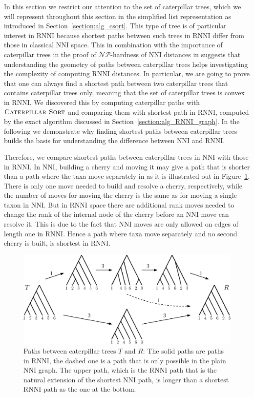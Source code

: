 \documentclass{amsart}
\newcommand{\np}{\mathcal{NP}}
\newcommand{\nni}{\mathrm{NNI}}
\newcommand{\rnni}{\mathrm{RNNI}}
\newcommand{\csort}{\textsc{Caterpillar Sort}}
\begin{document}
In this section we restrict our attention to the set of caterpillar trees, which we will represent throughout this section in the simplified list representation as introduced in Section~\ref{section:alg_csort}.
This type of tree is of particular interest in $\rnni$ because shortest paths between such trees in $\rnni$ differ from those in classical $\nni$ space.
This in combination with the importance of caterpillar trees in the proof of $\np$-hardness of $\nni$ distances in \autocite{Dasgupta2000-xa} suggests that understanding the geometry of paths between caterpillar trees helps investigating the complexity of computing $\rnni$ distances.
In particular, we are going to prove that one can always find a shortest path between two caterpillar trees that contains caterpillar trees only, meaning that the set of caterpillar trees is convex in $\rnni$.
We discovered this by computing caterpillar paths with $\csort$ and comparing them with shortest path in $\rnni$, computed by the exact algorithm discussed in Section~\ref{section:alg_RNNI_graph}.
In the following we demonstrate why finding shortest paths between caterpillar trees builds the basis for understanding the difference between $\nni$ and $\rnni$.

Therefore, we compare shortest paths between caterpillar trees in $\nni$ with those in $\rnni$.
In $\nni$, building a cherry and moving it may give a path that is shorter than a path where the taxa move separately in as it is illustrated out in Figure~\ref{fig:NNI_vs_RNNI}.
There is only one move needed to build and resolve a cherry, respectively, while the number of moves for moving the cherry is the same as for moving a single taxon in $\nni$.
But in $\rnni$ space there are additional rank moves needed to change the rank of the internal node of the cherry before an $\nni$ move can resolve it.
This is due to the fact that $\nni$ moves are only allowed on edges of length one in $\rnni$.
Hence a path where taxa move separately and no second cherry is built, is shortest in $\rnni$.

\begin{figure}[H]
	\centering
	\includegraphics[width=\textwidth]{NNI_vs_RNNI}
    \vspace{12pt}
	\caption{Paths between caterpillar trees $T$ and $R$: The solid paths are paths in $\rnni$, the dashed one is a path that is only possible in the plain $\nni$ graph.
    The upper path, which is the $\rnni$ path that is the natural extension of the shortest $\nni$ path, is longer than a shortest $\rnni$ path as the one at the bottom.}
	\label{fig:NNI_vs_RNNI}
\end{figure}
\end{document}
